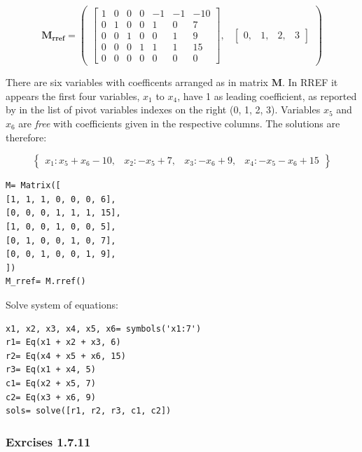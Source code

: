 \begin{equation}\label{eq:}
\mathbf{M_{rref}}= \begin{pmatrix}\left[\begin{matrix}1 & 0 & 0 & 0 & -1 & -1 & -10\\0 & 1 & 0 & 0 & 1 & 0 & 7\\0 & 0 & 1 & 0 & 0 & 1 & 9\\0 & 0 & 0 & 1 & 1 & 1 & 15\\0 & 0 & 0 & 0 & 0 & 0 & 0\end{matrix}\right], & \begin{bmatrix}0, & 1, & 2, & 3\end{bmatrix}\end{pmatrix}
\end{equation}

There are six variables with coefficents arranged as in matrix $\mathbf{M}$. In
RREF it appears the first four variables, $x_1$ to $x_4$, have 1 as leading
coefficient, as reported by \sympy in the list of pivot variables indexes on the right
(0, 1, 2, 3). Variables $x_5$ and $x_6$ are \textit{free} with coefficients given
in the respective columns. The solutions are therefore:

\begin{equation}\label{eq:}
\begin{Bmatrix}x_{1} : x_{5} + x_{6} - 10, & x_{2} : - x_{5} + 7, & x_{3} : - x_{6} + 9, & x_{4} : - x_{5} - x_{6} + 15\end{Bmatrix}
\end{equation}

\begin{verbatim}
M= Matrix([
[1, 1, 1, 0, 0, 0, 6],
[0, 0, 0, 1, 1, 1, 15],
[1, 0, 0, 1, 0, 0, 5],
[0, 1, 0, 0, 1, 0, 7],
[0, 0, 1, 0, 0, 1, 9],
])
M_rref= M.rref()
\end{verbatim}

Solve system of equations:

\begin{verbatim}
x1, x2, x3, x4, x5, x6= symbols('x1:7')
r1= Eq(x1 + x2 + x3, 6)
r2= Eq(x4 + x5 + x6, 15)
r3= Eq(x1 + x4, 5)
c1= Eq(x2 + x5, 7)
c2= Eq(x3 + x6, 9)
sols= solve([r1, r2, r3, c1, c2])
\end{verbatim}

\subsubsection{Exrcises 1.7.11}

